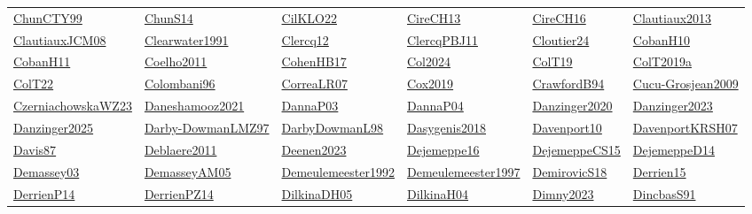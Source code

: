 \begin{longtable}{*{6}{l}}
\hyperref[detail:ChunCTY99]{ChunCTY99} & \hyperref[detail:ChunS14]{ChunS14} & \hyperref[detail:CilKLO22]{CilKLO22} & \hyperref[detail:CireCH13]{CireCH13} & \hyperref[detail:CireCH16]{CireCH16} & \hyperref[detail:Clautiaux2013]{Clautiaux2013}\\ 
\hyperref[detail:ClautiauxJCM08]{ClautiauxJCM08} & \hyperref[detail:Clearwater1991]{Clearwater1991} & \hyperref[detail:Clercq12]{Clercq12} & \hyperref[detail:ClercqPBJ11]{ClercqPBJ11} & \hyperref[detail:Cloutier24]{Cloutier24} & \hyperref[detail:CobanH10]{CobanH10}\\ 
\hyperref[detail:CobanH11]{CobanH11} & \hyperref[detail:Coelho2011]{Coelho2011} & \hyperref[detail:CohenHB17]{CohenHB17} & \hyperref[detail:Col2024]{Col2024} & \hyperref[detail:ColT19]{ColT19} & \hyperref[detail:ColT2019a]{ColT2019a}\\ 
\hyperref[detail:ColT22]{ColT22} & \hyperref[detail:Colombani96]{Colombani96} & \hyperref[detail:CorreaLR07]{CorreaLR07} & \hyperref[detail:Cox2019]{Cox2019} & \hyperref[detail:CrawfordB94]{CrawfordB94} & \hyperref[detail:Cucu-Grosjean2009]{Cucu-Grosjean2009}\\ 
\hyperref[detail:CzerniachowskaWZ23]{CzerniachowskaWZ23} & \hyperref[detail:Daneshamooz2021]{Daneshamooz2021} & \hyperref[detail:DannaP03]{DannaP03} & \hyperref[detail:DannaP04]{DannaP04} & \hyperref[detail:Danzinger2020]{Danzinger2020} & \hyperref[detail:Danzinger2023]{Danzinger2023}\\ 
\hyperref[detail:Danzinger2025]{Danzinger2025} & \hyperref[detail:Darby-DowmanLMZ97]{Darby-DowmanLMZ97} & \hyperref[detail:DarbyDowmanL98]{DarbyDowmanL98} & \hyperref[detail:Dasygenis2018]{Dasygenis2018} & \hyperref[detail:Davenport10]{Davenport10} & \hyperref[detail:DavenportKRSH07]{DavenportKRSH07}\\ 
\hyperref[detail:Davis87]{Davis87} & \hyperref[detail:Deblaere2011]{Deblaere2011} & \hyperref[detail:Deenen2023]{Deenen2023} & \hyperref[detail:Dejemeppe16]{Dejemeppe16} & \hyperref[detail:DejemeppeCS15]{DejemeppeCS15} & \hyperref[detail:DejemeppeD14]{DejemeppeD14}\\ 
\hyperref[detail:Demassey03]{Demassey03} & \hyperref[detail:DemasseyAM05]{DemasseyAM05} & \hyperref[detail:Demeulemeester1992]{Demeulemeester1992} & \hyperref[detail:Demeulemeester1997]{Demeulemeester1997} & \hyperref[detail:DemirovicS18]{DemirovicS18} & \hyperref[detail:Derrien15]{Derrien15}\\ 
\hyperref[detail:DerrienP14]{DerrienP14} & \hyperref[detail:DerrienPZ14]{DerrienPZ14} & \hyperref[detail:DilkinaDH05]{DilkinaDH05} & \hyperref[detail:DilkinaH04]{DilkinaH04} & \hyperref[detail:Dimny2023]{Dimny2023} & \hyperref[detail:DincbasS91]{DincbasS91}\\ 

\end{longtable}
